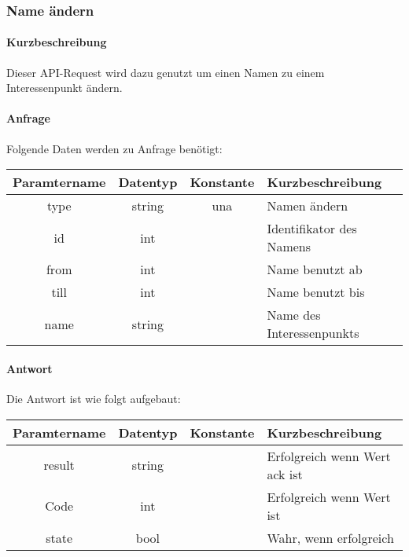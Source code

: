 \subsubsection{Name ändern}
\paragraph{Kurzbeschreibung}Dieser API-Request wird dazu genutzt um einen Namen zu einem Interessenpunkt ändern.
\paragraph{Anfrage}Folgende Daten werden zu Anfrage benötigt:
\begin{table}[H]
	\begin{tabular}{|c|c|c|p{6.5cm}|}
		\hline
		\textbf{Paramtername} & \textbf{Datentyp} & \textbf{Konstante} & \textbf{Kurzbeschreibung}                                                                                               \\ \hline
		type                & string            & una                & Namen ändern \\ \hline
		id                  & int               &                    & Identifikator des Namens \\ \hline
		from                & int               &                    & Name benutzt ab \\ \hline
		till                & int               &                    & Name benutzt bis \\ \hline
		name                & string            &                    & Name des Interessenpunkts \\ \hline
	\end{tabular}
\end{table}
\paragraph{Antwort}Die Antwort ist wie folgt aufgebaut:
\begin{table}[H]
	\begin{tabular}{|c|c|c|p{6.5cm}|}
		\hline
		\textbf{Paramtername} & \textbf{Datentyp} & \textbf{Konstante} & \textbf{Kurzbeschreibung}                                                                                               \\ \hline
		result              & string           &                 & Erfolgreich wenn Wert {\glqq ack\grqq} ist \\ \hline
		Code                & int              &                 & Erfolgreich wenn Wert {\glqq 0\grqq} ist \\ \hline
		state               & bool             &                 & Wahr, wenn erfolgreich \\ \hline
	\end{tabular}
\end{table}
